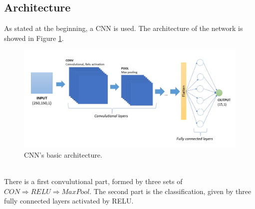 \subsection{Architecture}
As stated at the beginning, a CNN is used. The architecture of the network is showed in Figure \ref{fig:BasicArch}.\\
\begin{figure}[h!]
	\centering
	\includegraphics[width=0.7\linewidth]{./ImageFiles/CNN/BasicArch}
	\caption{CNN's basic architecture.}
	\label{fig:BasicArch}
\end{figure}\\
There is a first convulutional part, formed by three sets of $CON \Rightarrow RELU \Rightarrow MaxPool$. The second part is the classification, given by three fully connected layers activated by RELU.